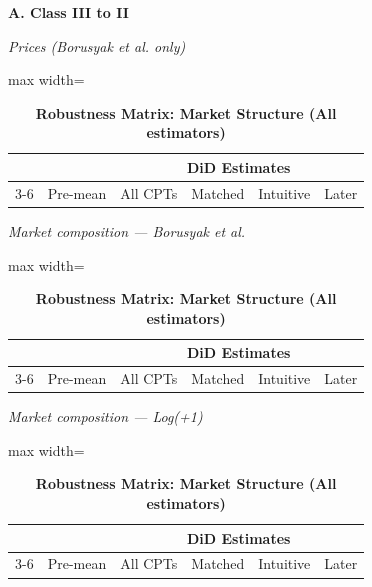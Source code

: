 \documentclass[letterpaper,12pt]{article}
\theoremstyle{definition}
\begin{document}
\begin{table}[t]
\centering
\caption{\textbf{Robustness Matrix: Market Structure (All estimators)}}
\begin{threeparttable}

\noindent\makebox[\textwidth]{\rule{\textwidth}{0.5pt}}

\vspace{-13pt}

\noindent\makebox[\textwidth]{\rule{\textwidth}{0.5pt}}

\begin{minipage}[t]{0.49\textwidth}
\centering\scriptsize
\textbf{A. Class III to II}\par\vspace{4pt}
\emph{Prices (Borusyak et al. only)}\par
\begin{adjustbox}{max width=\linewidth}
\begin{tabular}{@{}lccccc@{}}
\toprule
 &  & \multicolumn{4}{c}{DiD Estimates} \\
\cmidrule(lr){3-6}
 & Pre-mean & All CPTs & Matched & Intuitive & Later \\
\midrule

\bottomrule
\end{tabular}
\end{adjustbox}\vspace{6pt}

\emph{Market composition --- Borusyak et al.}\par
\begin{adjustbox}{max width=\linewidth}
\begin{tabular}{@{}lccccc@{}}
\toprule
 &  & \multicolumn{4}{c}{DiD Estimates} \\
\cmidrule(lr){3-6}
 & Pre-mean & All CPTs & Matched & Intuitive & Later \\
\midrule

\bottomrule
\end{tabular}
\end{adjustbox}\vspace{6pt}

\emph{Market composition --- Log(+1)}\par
\begin{adjustbox}{max width=\linewidth}
\begin{tabular}{@{}lccccc@{}}
\toprule
 &  & \multicolumn{4}{c}{DiD Estimates} \\
\cmidrule(lr){3-6}
 & Pre-mean & All CPTs & Matched & Intuitive & Later \\
\midrule

\bottomrule
\end{tabular}
\end{adjustbox}\vspace{6pt}


\end{minipage}
\end{threeparttable}
\end{table}
\end{document}

